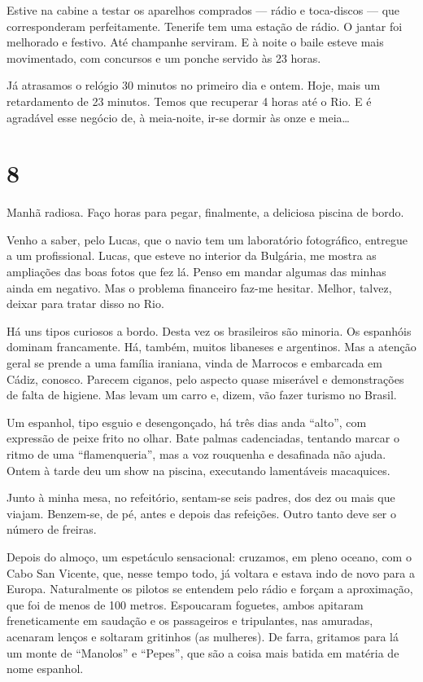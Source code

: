Estive na cabine a testar os aparelhos comprados --- rádio e toca-discos --- que corresponderam perfeitamente. Tenerife tem uma estação de rádio. O jantar foi melhorado e festivo. Até champanhe serviram. E à noite o baile esteve mais movimentado, com concursos e um ponche servido às 23 horas.

Já atrasamos o relógio 30 minutos no primeiro dia e ontem. Hoje, mais um retardamento de 23 minutos. Temos que recuperar 4 horas até o Rio. E é agradável esse negócio de, à meia-noite, ir-se dormir às onze e meia\ldots

\section*{8 \adfflatleafright {}}
Manhã radiosa. Faço horas para pegar, finalmente, a deliciosa piscina de bordo.

Venho a saber, pelo Lucas, que o navio tem um laboratório fotográfico, entregue a um profissional. Lucas, que esteve no interior da Bulgária, me mostra as ampliações das boas fotos que fez lá. Penso em mandar algumas das minhas ainda em negativo. Mas o problema financeiro faz-me hesitar. Melhor, talvez, deixar para tratar disso no Rio.

Há uns tipos curiosos a bordo. Desta vez os brasileiros são minoria. Os espanhóis dominam francamente. Há, também, muitos libaneses e argentinos. Mas a atenção geral se prende a uma família iraniana, vinda de Marrocos e embarcada em Cádiz, conosco. Parecem ciganos, pelo aspecto quase miserável e demonstrações de falta de higiene. Mas levam um carro e, dizem, vão fazer turismo no Brasil.

Um espanhol, tipo esguio e desengonçado, há três dias anda ``alto'', com expressão de peixe frito no olhar. Bate palmas cadenciadas, tentando marcar o ritmo de uma ``flamenqueria'', mas a voz rouquenha e desafinada não ajuda. Ontem à tarde deu um show na piscina, executando lamentáveis macaquices.

Junto à minha mesa, no refeitório, sentam-se seis padres, dos dez ou mais que viajam. Benzem-se, de pé, antes e depois das refeições. Outro tanto deve ser o número de freiras.

Depois do almoço, um espetáculo sensacional: cruzamos, em pleno oceano, com o Cabo San Vicente, que, nesse tempo todo, já voltara e estava indo de novo para a Europa. Naturalmente os pilotos se entendem pelo rádio e forçam a aproximação, que foi de menos de 100 metros. Espoucaram foguetes, ambos apitaram freneticamente em saudação e os passageiros e tripulantes, nas amuradas, acenaram lenços e soltaram gritinhos (as mulheres). De farra, gritamos para lá um monte de ``Manolos'' e ``Pepes'', que são a coisa mais batida em matéria de nome espanhol.

